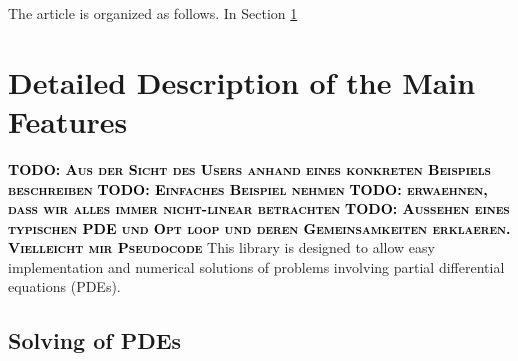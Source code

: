 \documentclass[prodmode,acmtoms]{acmsmall}
\numberwithin{equation}{section}
\newcommand{\todo}[1]{\textbf{\textsc{\textcolor{black}{TODO: #1}}}}
\begin{document}
The article is organized as follows. In Section
\ref{detailed_description} 
 
%
%
%



\section{Detailed Description of the Main Features}
\label{detailed_description}
\todo{Aus der Sicht des Users anhand eines konkreten Beispiels beschreiben}
\todo{Einfaches Beispiel nehmen}
\todo{erwaehnen, dass wir alles immer nicht-linear betrachten}
\todo{Aussehen eines typischen PDE und Opt loop und deren Gemeinsamkeiten
erklaeren. Vielleicht mir Pseudocode}
This library is designed to allow easy implementation and numerical solutions 
of problems involving partial differential equations (PDEs). 
\subsection{Solving of PDEs}
\end{document}
